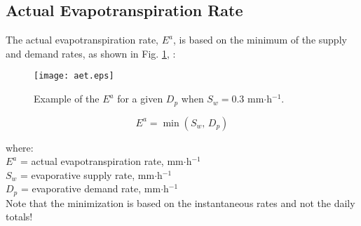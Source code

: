 \subsection{Actual Evapotranspiration Rate}
\label{sec:aet}
The actual evapotranspiration rate, $E^a$, is based on the minimum of the supply and demand rates, as shown in Fig. \ref{fig:aet}, \parencite[Eq. 7]{federer82}:

\begin{figure}[ht!]
    \texttt{[image: aet.eps]}
    \caption{Example of the $E^a$ for a given $D_p$ when $S_w = 0.3$ mm$\cdot$h$^{-1}$.}
    \label{fig:aet}
\end{figure}

\begin{equation}
\label{eq:aet}
	E^a = \min\left(S_w\text{, }D_p\right)
\end{equation}

\noindent where:\\
\indent $E^a$ = actual evapotranspiration rate, mm$\cdot$h$^{-1}$\\
\indent $S_w$ = evaporative supply rate, mm$\cdot$h$^{-1}$\\
\indent $D_p$ = evaporative demand rate, mm$\cdot$h$^{-1}$\\

\noindent Note that the minimization is based on the instantaneous rates and not the daily totals!

